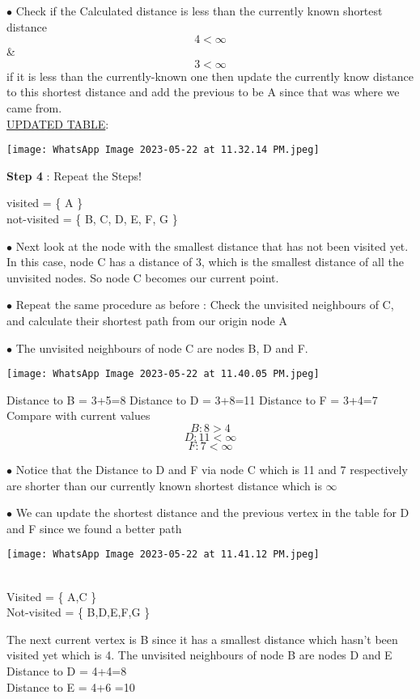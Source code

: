 \documentclass[23pt]{article}
\begin{document}
$\bullet$ Check if the Calculated distance is less than the currently known shortest distance 
		$$ 4 < \infty $$ \&
		$$ 3 < \infty $$
	    if it is less than the currently-known one then update the currently know distance to this shortest distance and add the previous to be A since that was where we came from.\\
     \underline{UPDATED TABLE}:

       \begin{center}
\texttt{[image: WhatsApp Image 2023-05-22 at 11.32.14 PM.jpeg]}
\end{center}

\textbf{Step 4} :  Repeat the Steps!
		
		visited = \{ A \} \\
		not-visited = \{ B, C, D, E, F, G \}
	
	$\bullet$ Next look at the node with the smallest distance that has not been visited yet. In this case, node C has 	   a distance of 3, which is the smallest distance of all the unvisited nodes. So node C becomes our current  point.

	$\bullet$ Repeat the same procedure as before : Check the unvisited neighbours of C, and calculate their shortest path from our origin node A

	$\bullet$  The unvisited neighbours of node C are nodes B, D and F.
\begin{center}
\texttt{[image: WhatsApp Image 2023-05-22 at 11.40.05 PM.jpeg]}
\end{center}
 
	Distance to B = 3+5=8
	Distance to D = 3+8=11
	Distance to F = 3+4=7
	Compare with current values 
	    $$ B: 8 > 4 $$ 
		$$ D: 11 < \infty $$ 
		$$ F: 7 < \infty $$ 

	$\bullet$  Notice that the Distance to D and F via node C which is 11 and 7 respectively are shorter than our currently known shortest distance which is $\infty$

	$\bullet$  We can update the shortest distance and the previous vertex in the table for D and F since we found a better path

 \begin{center}
\texttt{[image: WhatsApp Image 2023-05-22 at 11.41.12 PM.jpeg]}
\end{center}
\\
        Visited = \{ A,C \} \\
	Not-visited = \{ B,D,E,F,G \}

	The next current vertex is B since it has a smallest distance which hasn't been visited yet which is 4.
	The unvisited neighbours of node B are nodes D and E \\
        Distance to D = 4+4=8 \\
	Distance to E = 4+6 =10
\end{document}
